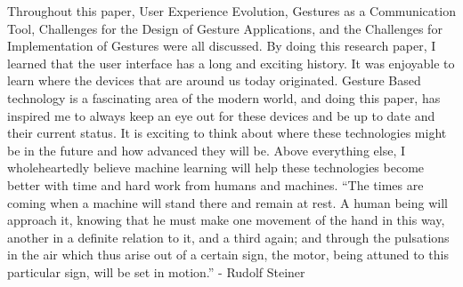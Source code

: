 \documentclass{article}
\begin{document}
Throughout this paper, User Experience Evolution, Gestures as a Communication Tool, Challenges for the Design of Gesture Applications, and the Challenges for Implementation of Gestures were all discussed. By doing this research paper, I learned that the user interface has a long and exciting history. It was enjoyable to learn where the devices that are around us today originated. Gesture Based technology is a fascinating area of the modern world, and doing this paper, has inspired me to always keep an eye out for these devices and be up to date and their current status.
It is exciting to think about where these technologies might be in the future and how advanced they will be. Above everything else, I wholeheartedly believe machine learning will help these technologies become better with time and hard work from humans and machines. 
\newline
\newline
“The times are coming when a machine will stand there and remain at rest. A human being will approach it, knowing that he must make one movement of the hand in this way, another in a definite relation to it, and a third again; and through the pulsations in the air which thus arise out of a certain sign, the motor, being attuned to this particular sign, will be set in motion.” - Rudolf Steiner \cite{ref17}

\end{document}
